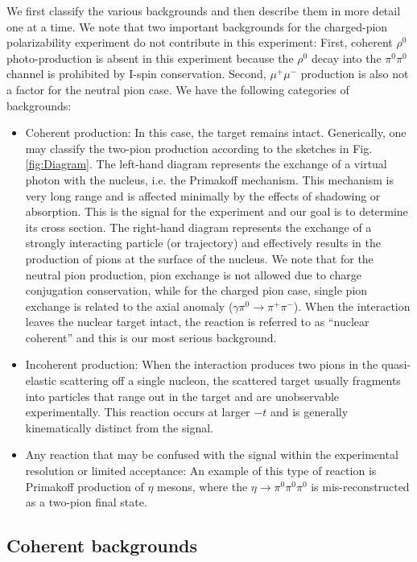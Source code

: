 We first classify the various backgrounds and then describe them in more detail one at a time.
We note that two important backgrounds for the charged-pion polarizability experiment do not contribute in this experiment:
First, coherent $\rho^0$ photo-production is absent in this
experiment because the $\rho^0$ decay into the $\pi^0\pi^0$ channel is prohibited by I-spin conservation.  Second, $\mu^+\mu^-$ production is also not a factor for the neutral pion case.
We have the following categories of backgrounds:
\begin{itemize}
\item Coherent production: In this case, the target remains intact. Generically, one may classify the two-pion production
according to the sketches in Fig.\,\ref{fig:Diagram}. The left-hand diagram represents the exchange of a virtual photon with the nucleus, i.e. the Primakoff
mechanism. This mechanism is very long range and is affected minimally by the effects of shadowing or absorption.  This is the signal for the
experiment and our goal is to determine its cross section.
The right-hand diagram represents the exchange of a strongly interacting particle (or trajectory) and effectively results in the production of pions at the
surface of the nucleus. We note that for the neutral pion production, pion exchange is not allowed due to charge conjugation conservation, while 
for the charged pion case, single pion exchange is related to the axial anomaly ($\gamma \pi^0 \rightarrow \pi^+ \pi^-$).  When the interaction leaves the
nuclear target intact, the reaction is referred to as ``nuclear coherent'' and this is our most serious background. 
\item Incoherent production:  When the interaction produces two pions in the quasi-elastic scattering off a single
nucleon, the scattered target usually fragments into particles that range out in the target and are unobservable experimentally. This reaction occurs at larger $-t$ and is generally
kinematically distinct from the signal.
\item Any reaction that may be confused with the signal within the experimental resolution or limited acceptance:
 An example of this type of reaction is Primakoff production of $\eta$ mesons, where the $\eta\rightarrow \pi^0 \pi^0 \pi^0$  is
mis-reconstructed as a two-pion final state. 
\end{itemize}

\subsection{Coherent backgrounds}

